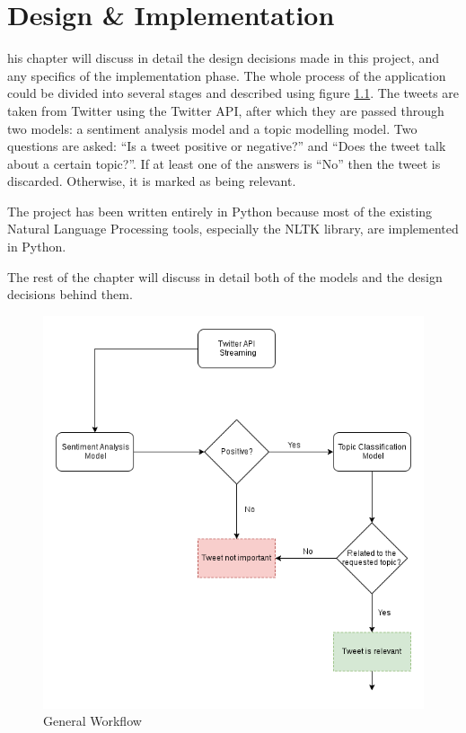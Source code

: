 \let\textcircled=\pgftextcircled
\chapter{Design \& Implementation}
\label{chap:des_imp}

his chapter will discuss in detail the design decisions made in this project, and any specifics of the implementation phase. 
The whole process of the application could be divided into several stages and described using figure \ref{fig:workflow}. The tweets are taken from Twitter using the Twitter API, after which they are passed through two models: a sentiment analysis model and a topic modelling model. Two questions are asked: ``Is a tweet positive or negative?'' and ``Does the tweet talk about a certain topic?''. If at least one of the answers is ``No'' then the tweet is discarded. Otherwise, it is marked as being relevant.

The project has been written entirely in Python because most of the existing Natural Language Processing tools, especially the NLTK library, are implemented in Python.

The rest of the chapter will discuss in detail both of the models and the design decisions behind them. 

\begin{figure}
    \centering
    \includegraphics[width=\textwidth]{workflow}
    \caption{General Workflow}
    \label{fig:workflow}
\end{figure}

